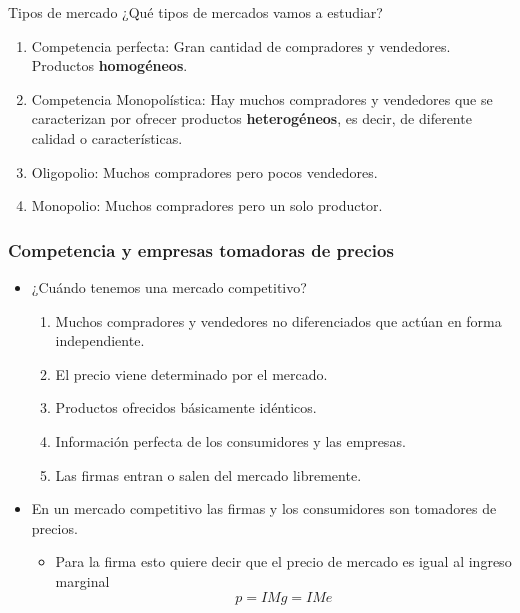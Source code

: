 \documentclass{beamer}
\begin{document}
\begin{frame}{Tipos de mercado}
    ¿Qué tipos de mercados vamos a estudiar?
    \begin{enumerate}
        \item Competencia perfecta: Gran cantidad de compradores y vendedores. Productos \textbf{homogéneos}.
        \item Competencia Monopolística: Hay muchos compradores
        y vendedores que se caracterizan por ofrecer productos \textbf{heterogéneos}, es decir, de diferente
        calidad o características.
        \item Oligopolio: Muchos compradores pero pocos vendedores.
        \item Monopolio: Muchos compradores pero un solo productor.
    \end{enumerate}
\end{frame}

\begin{frame}
\frametitle{Competencia y empresas tomadoras de precios}
\begin{itemize}
    \item ¿Cuándo tenemos una mercado competitivo?
    \begin{enumerate}
        \item Muchos compradores y vendedores no diferenciados que actúan en forma independiente.
        \item El precio viene determinado por el mercado.
        \item Productos ofrecidos básicamente idénticos.
        \item Información perfecta de los consumidores y las empresas.
        \item Las firmas entran o salen del mercado libremente.
    \end{enumerate}
    \vspace{2mm}
    \item En un mercado competitivo las firmas y los consumidores son tomadores de precios.
    \begin{itemize}
        \item Para la firma esto quiere decir que el precio de mercado es igual al ingreso marginal
        \[ p = IMg = IMe \]
    \end{itemize}
\end{itemize}
\end{frame}
\end{document}

